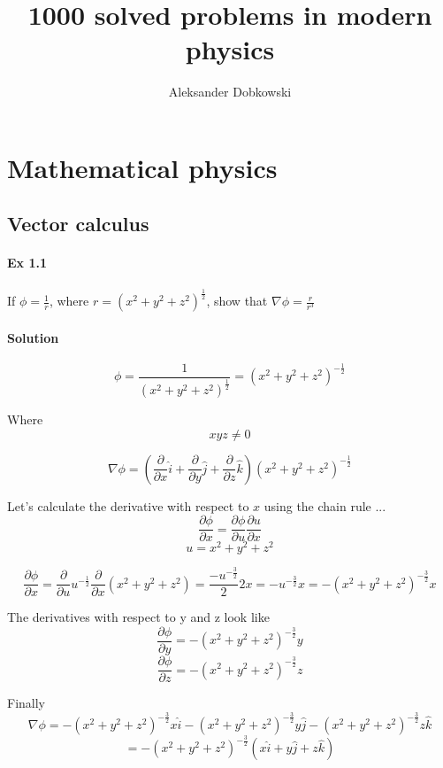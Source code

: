 \documentclass{article}
\title{1000 solved problems in modern physics}
\author{Aleksander Dobkowski}
\date{}
\begin{document}
\maketitle

\section{Mathematical physics}
\subsection{Vector calculus}


\paragraph{Ex 1.1}
If $\phi=\frac{1}{r}$, where $r = \left( x^2 + y^2 + z^2 \right)^{\frac{1}{2}}$, show that $\nabla \phi = \frac{r}{r^3}$
\paragraph{Solution}

\[ \phi = \frac{1}{\left( x^2 + y^2 + z^2 \right)^{\frac{1}{2}}} = 
\left( x^2 + y^2 + z^2 \right)^{-\frac{1}{2}} \]

Where
\[ x y z \not = 0 \]

\[ \nabla \phi =
\left( \frac{\partial}{\partial x} \hat{i} + \frac{\partial}{\partial y} \hat{j} + \frac{\partial}{\partial z} \hat{k} \right) \left( x^2 + y^2 + z^2 \right)^{-\frac{1}{2}}\]

Let's calculate the derivative with respect to $x$ using the chain rule ...
\[ \frac{\partial \phi}{\partial x} = 
\frac{\partial \phi}{\partial u} \frac{\partial u}{\partial x} \] 
\[ u = x^2 + y^2 + z^2 \]

\[ \frac{\partial \phi}{\partial x} = 
\frac{\partial}{\partial u} u^{-\frac{1}{2}} \frac{\partial}{\partial x} \left( x^2 + y^2 + z^2 \right) = \frac{-u^{-\frac{3}{2}}}{2} 2x = 
-u^{-\frac{3}{2}}x = 
-\left( x^2 + y^2 + z^2 \right)^{-\frac{3}{2}}x \]

The derivatives with respect to y and z look like
\[ \frac{\partial \phi}{\partial y} = -\left( x^2 + y^2 + z^2 \right)^{-\frac{3}{2}}y \]
\[ \frac{\partial \phi}{\partial z} = -\left( x^2 + y^2 + z^2 \right)^{-\frac{3}{2}}z \]

Finally
\[ \nabla \phi = 
-\left( x^2 + y^2 + z^2 \right)^{-\frac{3}{2}} x\hat{i} 
-\left( x^2 + y^2 + z^2 \right)^{-\frac{3}{2}} y\hat{j}
-\left( x^2 + y^2 + z^2 \right)^{-\frac{3}{2}} z\hat{k}\]
\[ = -\left( x^2 + y^2 + z^2 \right)^{-\frac{3}{2}} \left( x\hat{i} + y\hat{j} + z\hat{k} \right) \]
\end{document}
